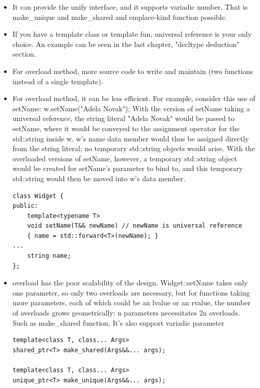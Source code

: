 \documentclass[a4paper,11pt,twoside]{book}
\begin{document}
\begin{itemize}
\item It can provide the unify interface, and it supports variadic number. That is make\_unique and make\_shared and emplace-kind function possible.

\item If you have a template class or template fun, universal reference is your only choice. An example can be seen in the last chapter, "decltype deduction" section.

\item For overload method, more source code to write and maintain (two functions instead of a single template). 

\item For overload method, it can be less efficient. For example, consider this use of setName: w.setName("Adela Novak"); With the version of setName taking a universal reference, the string literal "Adela Novak" would be passed to setName, where it would be conveyed to the assignment operator for the std::string inside w. w's name data member would thus be assigned directly from the string literal; no temporary std::string objects would arise. With the overloaded versions of setName, however, a temporary std::string object
would be created for setName's parameter to bind to, and this temporary std::string would then be moved into w's data member.

\begin{lstlisting}[numbers=none]
class Widget {
public:
	template<typename T>
	void setName(T&& newName) // newName is universal reference
	{ name = std::forward<T>(newName); }
...
	string name;    
};
\end{lstlisting}


\item overload has the poor scalability of the design. Widget::setName takes only one parameter, so only two overloads are necessary, but for functions taking more parameters, each of which could be an lvalue or an rvalue, the number of overloads grows geometrically: n parameters necessitates 2n overloads. Such as make\_shared function, It's also support variadic parameter

\begin{lstlisting}[numbers=none]
template<class T, class... Args> 
shared_ptr<T> make_shared(Args&&... args); 

template<class T, class... Args> 
unique_ptr<T> make_unique(Args&&... args); 
\end{lstlisting}


\end{itemize}
\end{document}
